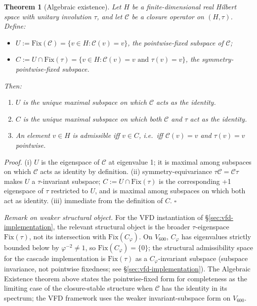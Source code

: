 \documentclass[11pt]{article}
\theoremstyle{plain}
\newtheorem{theorem}{Theorem}[section]
\theoremstyle{definition}
\theoremstyle{remark}
\newcommand{\Ccal}{\mathcal{C}}
\newcommand{\Fix}{\mathrm{Fix}}
\newcommand{\Cph}{C_\varphi}
\begin{document}
\begin{theorem}[Algebraic existence]\label{thm:existence}
Let $H$ be a finite-dimensional real Hilbert space with unitary involution $\tau$, and let $\Ccal$ be a closure operator on $(H, \tau)$. Define:
\begin{itemize}[leftmargin=2em]
\item $U := \Fix(\Ccal) = \{ v \in H : \Ccal(v) = v \}$, the pointwise-fixed subspace of $\Ccal$;
\item $C := U \cap \Fix(\tau) = \{ v \in H : \Ccal(v) = v \text{ and } \tau(v) = v\}$, the symmetry-pointwise-fixed subspace.
\end{itemize}
Then:
\begin{enumerate}[leftmargin=2em]
\item[(i)] $U$ is the unique maximal subspace on which $\Ccal$ acts as the identity.
\item[(ii)] $C$ is the unique maximal subspace on which both $\Ccal$ and $\tau$ act as the identity.
\item[(iii)] An element $v \in H$ is \emph{admissible} iff $v \in C$, i.e.\ iff $\Ccal(v) = v$ and $\tau(v) = v$ pointwise.
\end{enumerate}
\end{theorem}

\noindent\emph{Proof.} (i) $U$ is the eigenspace of $\Ccal$ at eigenvalue 1; it is maximal among subspaces on which $\Ccal$ acts as identity by definition. (ii) symmetry-equivariance $\tau\Ccal = \Ccal\tau$ makes $U$ a $\tau$-invariant subspace; $C := U \cap \Fix(\tau)$ is the corresponding +1 eigenspace of $\tau$ restricted to $U$, and is maximal among subspaces on which both act as identity. (iii) immediate from the definition of $C$. \hfill$\square$

\noindent\emph{Remark on weaker structural object.} For the VFD instantiation of \S\ref{sec:vfd-implementation}, the relevant structural object is the broader $\tau$-eigenspace $\Fix(\tau)$, not its intersection with $\Fix(\Cph)$. On $V_{600}$, $\Cph$ has eigenvalues strictly bounded below by $\varphi^{-2} \neq 1$, so $\Fix(\Cph) = \{0\}$; the structural admissibility space for the cascade implementation is $\Fix(\tau)$ as a $\Cph$-invariant subspace (subspace invariance, not pointwise fixedness; see \S\ref{sec:vfd-implementation}). The Algebraic Existence theorem above states the pointwise-fixed form for completeness as the limiting case of the closure-stable structure when $\Ccal$ has the identity in its spectrum; the VFD framework uses the weaker invariant-subspace form on $V_{600}$.
\end{document}
